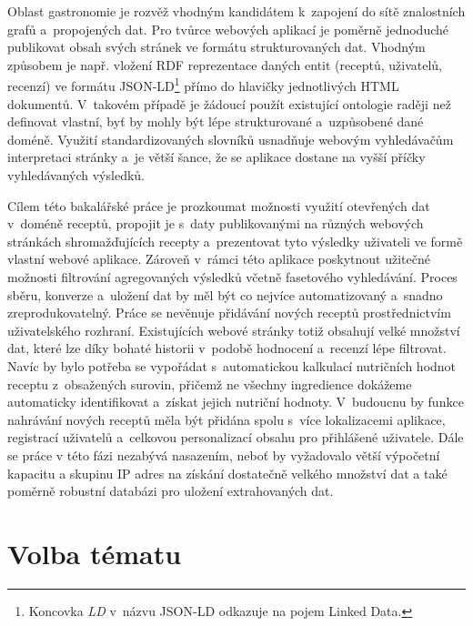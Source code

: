 Oblast gastronomie je rozvěž vhodným kandidátem k~zapojení do sítě znalostních grafů a~propojených dat. Pro tvůrce webových aplikací je poměrně jednoduché publikovat obsah svých stránek ve formátu strukturovaných dat. Vhodným způsobem je např. vložení RDF reprezentace daných entit (receptů, uživatelů, recenzí) ve formátu JSON-LD\footnote{Koncovka \emph{LD} v~názvu JSON-LD odkazuje na pojem Linked Data.} přímo do hlavičky jednotlivých HTML dokumentů. V~takovém případě je žádoucí použít existující ontologie raději než definovat vlastní, byť by mohly být lépe strukturované a~uzpůsobené dané doméně. Využití standardizovaných slovníků usnadňuje webovým vyhledávačům interpretaci stránky a~je větší šance, že se aplikace dostane na vyšší příčky vyhledávaných výsledků.

Cílem této bakalářské práce je prozkoumat možnosti využití otevřených dat v~doméně receptů, propojit je s~daty publikovanými na různých webových stránkách shromažďujících recepty a~prezentovat tyto výsledky uživateli ve formě vlastní webové aplikace. Zároveň v~rámci této aplikace poskytnout užitečné možnosti filtrování agregovaných výsledků včetně fasetového vyhledávání. Proces sbě\-ru, konverze a~uložení dat by měl být co nejvíce automatizovaný a~snadno zreprodukovatelný. Práce se nevěnuje přidávání nových receptů prostřednictvím uživatelského rozhraní. Existujících webové stránky totiž obsahují velké množství dat, které lze díky bohaté historii v~podobě hodnocení a~recenzí lépe filtrovat. Navíc by bylo potřeba se vypořádat s~automatickou kalkulací nutričních hodnot receptu z~obsažených surovin, přičemž ne všechny ingredience dokážeme automaticky identifikovat a~získat jejich nutriční hodnoty. V~budoucnu by funkce nahrávání nových receptů měla být přidána spolu s~více lokalizacemi aplikace, registrací uživatelů a~celkovou personalizací obsahu pro přihlášené uživatele. Dále se práce v této fázi nezabývá nasazením, neboť by vyžadovalo větší výpočetní kapacitu a skupinu IP adres na získání dostatečně velkého množství dat a také poměrně robustní databázi pro uložení extrahovaných dat. 

\section*{Volba tématu}
\setcounter{tocdepth}{1}

